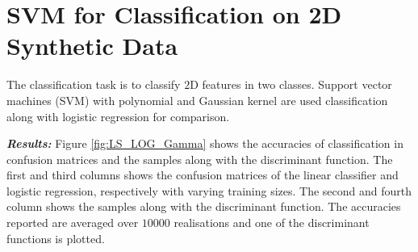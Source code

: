 \documentclass[12pt, a4 paper]{article}
\begin{document}







\section{SVM for Classification on 2D Synthetic Data}
\label{sec:svm_synthetic}

The classification task is to classify $2$D features in two classes. Support vector machines (SVM) with polynomial and Gaussian kernel are used classification along with logistic regression for comparison.

{\it \bfseries Results:} Figure \ref{fig:LS_LOG_Gamma} shows the accuracies of classification in confusion matrices and the samples along with the discriminant function. The first and third columns shows the confusion matrices of the linear classifier and logistic regression, respectively with varying training sizes. The second and fourth column shows the samples along with the discriminant function. The accuracies reported are averaged over $10000$ realisations and one of the discriminant functions is plotted. \\
\end{document}

